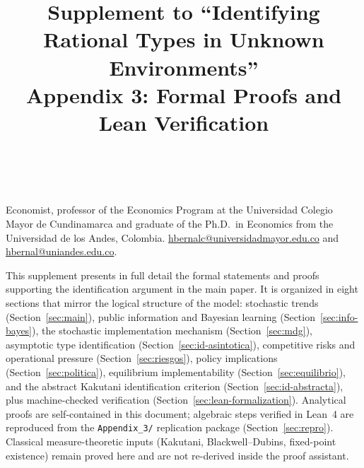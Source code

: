 \documentclass[ecta,nameyear,final,supplement]{econsocart}
\numberwithin{equation}{section}
\numberwithin{table}{section}
\theoremstyle{definition}
\begin{document}
\begin{frontmatter}

\title{Supplement to ``Identifying Rational Types in Unknown Environments''\\
Appendix 3: Formal Proofs and Lean Verification}

\begin{aug}
\author[add1,add2]{~}
\address[add1]{%
,
}
\address[add2]{%
,
}
\end{aug}

\begin{funding}
Economist, professor of the Economics Program at the Universidad Colegio
Mayor de Cundinamarca and graduate of the Ph.D.\ in Economics from the
Universidad de los Andes, Colombia.
\href{mailto:hbernalc@universidadmayor.edu.co}{hbernalc@universidadmayor.edu.co}
and \href{mailto:hbernal@uniandes.edu.co}{hbernal@uniandes.edu.co}.
\end{funding}

\end{frontmatter}

\noindent
This supplement presents in full detail the formal statements and proofs
supporting the identification argument in the main paper. It is organized in
eight sections that mirror the logical structure of the model: stochastic
trends (Section~\ref{sec:main}), public information and Bayesian learning
(Section~\ref{sec:info-bayes}), the stochastic implementation mechanism
(Section~\ref{sec:mdg}), asymptotic type identification
(Section~\ref{sec:id-asintotica}), competitive risks and operational pressure
(Section~\ref{sec:riesgos}), policy implications (Section~\ref{sec:politica}),
equilibrium implementability (Section~\ref{sec:equilibrio}), and the abstract
Kakutani identification criterion (Section~\ref{sec:id-abstracta}), plus
machine-checked verification (Section~\ref{sec:lean-formalization}). Analytical
proofs are self-contained in this document; algebraic steps verified in Lean~4
are reproduced from the \texttt{Appendix\_3/} replication package
(Section~\ref{sec:repro}). Classical measure-theoretic inputs (Kakutani,
Blackwell--Dubins, fixed-point existence) remain proved here and are not
re-derived inside the proof assistant.

\end{document}
